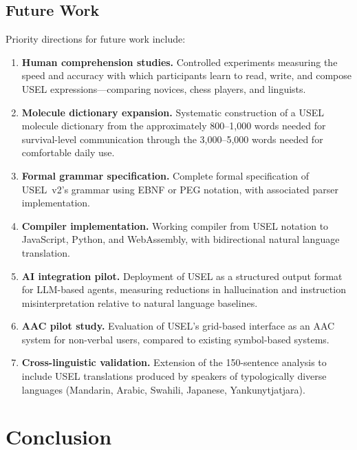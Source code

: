 \documentclass[11pt,a4paper]{article}
\begin{document}
\subsection{Future Work}
\label{sec:future-work}

Priority directions for future work include:

\begin{enumerate}[nosep]
    \item \textbf{Human comprehension studies.} Controlled experiments measuring the speed and accuracy with which participants learn to read, write, and compose USEL expressions---comparing novices, chess players, and linguists.
    \item \textbf{Molecule dictionary expansion.} Systematic construction of a USEL molecule dictionary from the approximately 800--1,000 words needed for survival-level communication \citep{nation2006large} through the 3,000--5,000 words needed for comfortable daily use.
    \item \textbf{Formal grammar specification.} Complete formal specification of USEL~v2's grammar using EBNF or PEG notation, with associated parser implementation.
    \item \textbf{Compiler implementation.} Working compiler from USEL notation to JavaScript, Python, and WebAssembly, with bidirectional natural language translation.
    \item \textbf{AI integration pilot.} Deployment of USEL as a structured output format for LLM-based agents, measuring reductions in hallucination and instruction misinterpretation relative to natural language baselines.
    \item \textbf{AAC pilot study.} Evaluation of USEL's grid-based interface as an AAC system for non-verbal users, compared to existing symbol-based systems.
    \item \textbf{Cross-linguistic validation.} Extension of the 150-sentence analysis to include USEL translations produced by speakers of typologically diverse languages (Mandarin, Arabic, Swahili, Japanese, Yankunytjatjara).
\end{enumerate}

\section{Conclusion}
\label{sec:conclusion}
\end{document}
